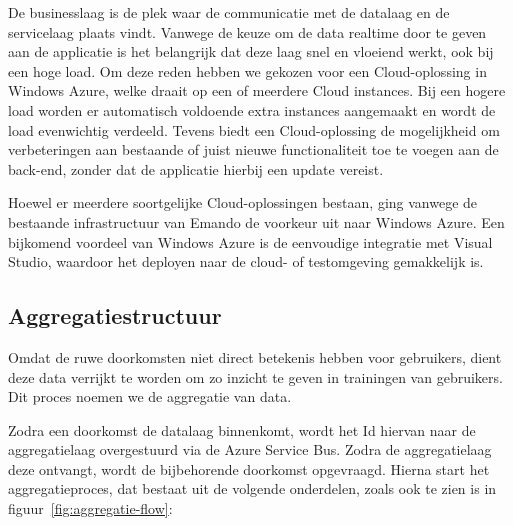 De businesslaag is de plek waar de communicatie met de datalaag en de servicelaag plaats vindt. Vanwege de keuze om de data realtime door te geven aan de applicatie is het belangrijk dat deze laag snel en vloeiend werkt, ook bij een hoge load. Om deze reden hebben we gekozen voor een Cloud-oplossing in Windows Azure, welke draait op een of meerdere Cloud instances. Bij een hogere load worden er automatisch voldoende extra instances aangemaakt en wordt de load evenwichtig verdeeld. Tevens biedt een Cloud-oplossing de mogelijkheid om verbeteringen aan bestaande of juist nieuwe functionaliteit toe te voegen aan de back-end, zonder dat de applicatie hierbij een update vereist.

Hoewel er meerdere soortgelijke Cloud-oplossingen bestaan, ging vanwege de bestaande infrastructuur van Emando de voorkeur uit naar Windows Azure. Een bijkomend voordeel van Windows Azure is de eenvoudige integratie met Visual Studio, waardoor het deployen naar de cloud- of testomgeving gemakkelijk is.

\subsection{Aggregatiestructuur}

Omdat de ruwe doorkomsten niet direct betekenis hebben voor gebruikers, dient deze data verrijkt te worden om zo inzicht te geven in trainingen van gebruikers. Dit proces noemen we de aggregatie van data.

Zodra een doorkomst de datalaag binnenkomt, wordt het Id hiervan naar de aggregatielaag overgestuurd via de Azure Service Bus. Zodra de aggregatielaag deze ontvangt, wordt de bijbehorende doorkomst opgevraagd. Hierna start het aggregatieproces, dat bestaat uit de volgende onderdelen, zoals ook te zien is in figuur~\ref{fig:aggregatie-flow}:

